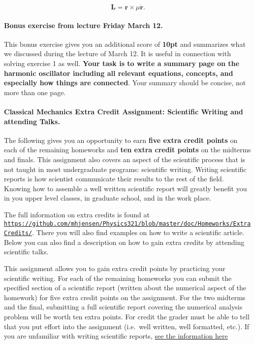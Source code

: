 \documentclass[%
oneside,                 %
final,                   %
10pt]{article}
\begin{document}
\noindent
\[
\bm{L}=\bm{r}\times \mu\dot{\bm{r}}.
\]

\paragraph{Bonus exercise from lecture Friday March 12.}
This bonus exercise gives you an additional score of \textbf{10pt} and summarizes what we discussed during the lecture of March 12. It is useful in connection with solving exercise 1 as well.
\textbf{Your task is to write a summary page on the harmonic oscillator including all relevant equations, concepts, and especially how things are connected}. Your summary should be concise, not more than one page.

\paragraph{Classical Mechanics Extra Credit Assignment: Scientific Writing and attending Talks.}
The following gives you an opportunity to earn \textbf{five extra credit
points} on each of the remaining homeworks and \textbf{ten extra credit points}
on the midterms and finals.  This assignment also covers an aspect of
the scientific process that is not taught in most undergraduate
programs: scientific writing.  Writing scientific reports is how
scientist communicate their results to the rest of the field.  Knowing
how to assemble a well written scientific report will greatly benefit
you in you upper level classes, in graduate school, and in the work
place.

The full information on extra credits is found at \href{{https://github.com/mhjensen/Physics321/blob/master/doc/Homeworks/ExtraCredits/}}{\nolinkurl{https://github.com/mhjensen/Physics321/blob/master/doc/Homeworks/ExtraCredits/}}. There you will also find examples on how to write a scientific article. 
Below you can also find a description on how to gain extra credits by attending scientific talks.

This assignment allows you to gain extra credit points by practicing
your scientific writing.  For each of the remaining homeworks you can
submit the specified section of a scientific report (written about the
numerical aspect of the homework) for five extra credit points on the
assignment.  For the two midterms and the final, submitting a full
scientific report covering the numerical analysis problem will be
worth ten extra points.  For credit the grader must be able to tell
that you put effort into the assignment (i.e.~well written, well
formatted, etc.).  If you are unfamiliar with writing scientific
reports, \href{{https://github.com/mhjensen/Physics321/blob/master/doc/Homeworks/ExtraCredits/IntroductionScientificWriting.md}}{see the information here}
\end{document}
